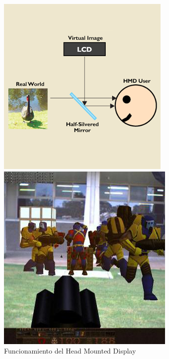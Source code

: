 \begin{figure}[ht]
    \centering
    \begin{minipage}{0.32\textwidth}
        \centering
        \includegraphics[width=\linewidth]{Images/ARQuake_HIW.png}
        \caption{Funcionamiento del Head Mounted Display}
    \label{fig:HIWARQuake}
    \end{minipage}\hfill
    \begin{minipage}{0.32\textwidth}
        \centering
        \includegraphics[width=\linewidth]{Images/arquake.jpg}

\end{minipage}
\end{figure}

